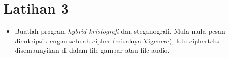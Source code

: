 \documentclass{article}
\begin{document}

\section*{Latihan 3}

\begin{itemize}
    \item Buatlah program \textit{hybrid kriptografi} dan steganografi. Mula-mula pesan dienkripsi dengan sebuah cipher (misalnya Vigenere), lalu cipherteks disembunyikan di dalam file gambar atau file audio.
\end{itemize}
\end{document}
